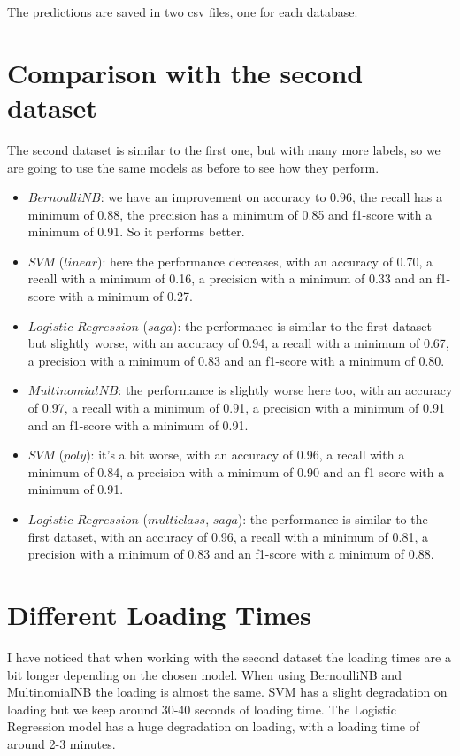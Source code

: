 \documentclass{article}
\begin{document}
\begin{titlepage}
  The predictions are saved in two csv files, one for each database.

  \newpage

  \section*{Comparison with the second dataset}
  The second dataset is similar to the first one, but with many more labels, so we are going to use the same models as before to see how they perform.

  \begin{itemize}
    \item $BernoulliNB$: we have an improvement on accuracy to 0.96, the recall has a minimum of 0.88, the precision has a minimum of 0.85 and f1-score with a minimum of 0.91. So it performs better.
    \item $SVM$ ($linear$): here the performance decreases, with an accuracy of 0.70, a recall with a minimum of 0.16, a precision with a minimum of 0.33 and an f1-score with a minimum of 0.27.
    \item $Logistic$ $Regression$ ($saga$): the performance is similar to the first dataset but slightly worse, with an accuracy of 0.94, a recall with a minimum of 0.67, a precision with a minimum of 0.83 and an f1-score with a minimum of 0.80.
    \item $MultinomialNB$: the performance is slightly worse here too, with an accuracy of 0.97, a recall with a minimum of 0.91, a precision with a minimum of 0.91 and an f1-score with a minimum of 0.91.
    \item $SVM$ ($poly$): it's a bit worse, with an accuracy of 0.96, a recall with a minimum of 0.84, a precision with a minimum of 0.90 and an f1-score with a minimum of 0.91.
    \item $Logistic$ $Regression$ ($multiclass$, $saga$): the performance is similar to the first dataset, with an accuracy of 0.96, a recall with a minimum of 0.81, a precision with a minimum of 0.83 and an f1-score with a minimum of 0.88.
  \end{itemize}

  \section{Different Loading Times}
  I have noticed that when working with the second dataset the loading times are a bit longer depending on the chosen model.
  When using BernoulliNB and MultinomialNB the loading is almost the same.
  SVM has a slight degradation on loading but we keep around 30-40 seconds of loading time.
  The Logistic Regression model has a huge degradation on loading, with a loading time of around 2-3 minutes.


\end{titlepage}
\end{document}
